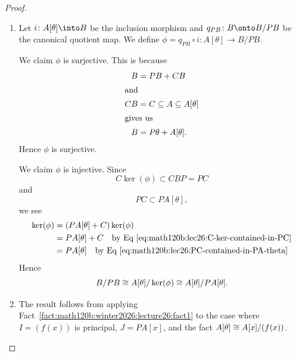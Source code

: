 \begin{proof}
\begin{enumerate}
\item Let $i\colon A[\theta]\into B$ be the inclusion morphism and
  $q_{PB}\colon B\onto B/PB$ be the canonical quotient map. We define
  $\phi=q_{PB}\circ i\colon A[\theta]\to B/PB$.

  We claim $\phi$ is surjective. This is because
\begin{subequations}
  \begin{align}
B&=PB + CB\\
\intertext{and}
CB&=C\subset A\subset A[\theta]\\
\intertext{gives us}
B&=P\theta+A[\theta].
  \end{align}
\end{subequations}
Hence $\phi$ is surjective.

We claim $\phi$ is injective.
Since
\begin{equation}\label{eq:math120b:lec26:C-ker-contained-in-PC}
C\ker(\phi)\subset CBP=PC
\end{equation}
and
\begin{equation}\label{eq:math120b:lec26:PC-contained-in-PA-theta}
PC\subset PA[\theta],
\end{equation}
we see
\begin{subequations}
  \begin{align}
\ker(\phi)
&=(PA[\theta]+C)\ker(\phi)\\
&=PA[\theta]+C\quad\mbox{by Eq~\eqref{eq:math120b:lec26:C-ker-contained-in-PC}}\\
&=PA[\theta]\quad\mbox{by Eq~\eqref{eq:math120b:lec26:PC-contained-in-PA-theta}}
  \end{align}
\end{subequations}
Hence
\begin{equation}
B/PB\iso A[\theta]/\ker(\phi)\iso A[\theta]/PA[\theta].
\end{equation}
\item The result follows from applying Fact~\ref{fact:math120b:winter2026:lecture26:fact1}
to the case where $I=(f(x))$ is principal, $J=PA[x]$, and the fact
$A[\theta]\iso A[x]/(f(x))$. \qedhere
\end{enumerate}
\end{proof}

